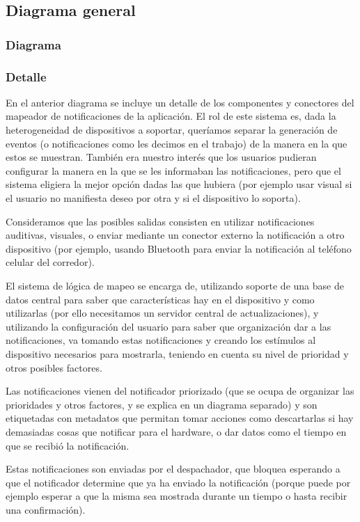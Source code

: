 \subsection{Diagrama general}
\subsubsection{Diagrama}


\subsubsection{Detalle}

En el anterior diagrama se incluye un detalle de los componentes y
conectores del mapeador de notificaciones de la aplicación. El rol
de este sistema es, dada la heterogeneidad de dispositivos a soportar,
queríamos separar la generación de eventos (o notificaciones como les
decimos en el trabajo) de la manera en la que estos se muestran. 
También era nuestro interés que los usuarios pudieran configurar la
manera en la que se les informaban las notificaciones, pero que el
sistema eligiera la mejor opción dadas las que hubiera (por ejemplo
usar visual si el usuario no manifiesta deseo por otra y si el 
dispositivo lo soporta).

Consideramos que las posibles salidas consisten en utilizar 
notificaciones auditivas, visuales, o enviar mediante un conector
externo la notificación a otro dispositivo (por ejemplo, usando
Bluetooth para enviar la notificación al teléfono celular del 
corredor).

El sistema de lógica de mapeo se encarga de, utilizando soporte de
una base de datos central para saber que características hay en
el dispositivo y como utilizarlas (por ello necesitamos un servidor
central de actualizaciones), y utilizando la configuración del usuario
para saber que organización dar a las notificaciones, va tomando 
estas notificaciones y creando los estímulos al dispositivo 
necesarios para mostrarla, teniendo en cuenta su nivel de prioridad 
y otros posibles factores.

Las notificaciones vienen del notificador priorizado (que se ocupa de
organizar las prioridades y otros factores, y se explica en un 
diagrama separado) y son etiquetadas con metadatos que permitan 
tomar acciones como descartarlas si hay demasiadas cosas que notificar
para el hardware, o dar datos como el tiempo en que se recibió la
notificación. 

Estas notificaciones son enviadas por el despachador, que bloquea
esperando a que el notificador determine que ya ha enviado la 
notificación (porque puede por ejemplo esperar a que la misma sea
mostrada durante un tiempo o hasta recibir una confirmación).
